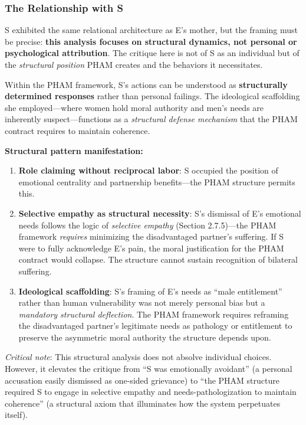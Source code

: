 \documentclass[12pt, letterpaper]{article}
\begin{document}
\subsubsection{The Relationship with S}

S exhibited the same relational architecture as E's mother, but the framing must be precise: \textbf{this analysis focuses on structural dynamics, not personal or psychological attribution}. The critique here is not of S as an individual but of the \textit{structural position} PHAM creates and the behaviors it necessitates.

Within the PHAM framework, S's actions can be understood as \textbf{structurally determined responses} rather than personal failings. The ideological scaffolding she employed---where women hold moral authority and men's needs are inherently suspect---functions as a \textit{structural defense mechanism} that the PHAM contract requires to maintain coherence.

\textbf{Structural pattern manifestation:}
\begin{enumerate}
    \item \textbf{Role claiming without reciprocal labor}: S occupied the position of emotional centrality and partnership benefits---the PHAM structure permits this.
    
    \item \textbf{Selective empathy as structural necessity}: S's dismissal of E's emotional needs follows the logic of \textit{selective empathy} (Section 2.7.5)---the PHAM framework \textit{requires} minimizing the disadvantaged partner's suffering. If S were to fully acknowledge E's pain, the moral justification for the PHAM contract would collapse. The structure cannot sustain recognition of bilateral suffering.
    
    \item \textbf{Ideological scaffolding}: S's framing of E's needs as ``male entitlement'' rather than human vulnerability was not merely personal bias but a \textit{mandatory structural deflection}. The PHAM framework requires reframing the disadvantaged partner's legitimate needs as pathology or entitlement to preserve the asymmetric moral authority the structure depends upon.
\end{enumerate}

\textit{Critical note}: This structural analysis does not absolve individual choices. However, it elevates the critique from ``S was emotionally avoidant'' (a personal accusation easily dismissed as one-sided grievance) to ``the PHAM structure required S to engage in selective empathy and needs-pathologization to maintain coherence'' (a structural axiom that illuminates how the system perpetuates itself).
\end{document}
